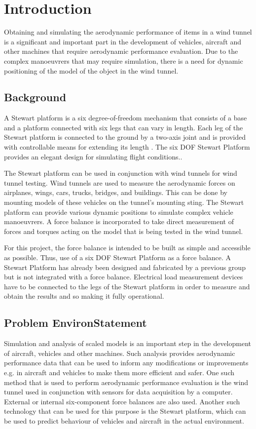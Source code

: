 \chapter{Introduction}
\label{sec:introduction}
Obtaining and simulating the aerodynamic performance of items in a wind tunnel is a
significant and important part in the development of vehicles, aircraft and other machines
that require aerodynamic performance evaluation. Due to the complex manoeuvrers that
may require simulation, there is a need for dynamic positioning of the model of the object
in the wind tunnel.
\section{Background}
A Stewart platform is a six degree-of-freedom mechanism that consists of a base and a platform connected with six legs that can vary in length. Each leg of the Stewart platform is connected to the ground by a two-axis joint and is provided with controllable means for extending its length
\cite{wittenburg2016stewart}. The six DOF Stewart Platform provides an elegant design for simulating flight conditions.\cite{stewart1965platform}. 

The Stewart platform can be used in conjunction with wind tunnels for wind tunnel testing. Wind tunnels are used to measure the aerodynamic forces on airplanes, wings, cars, trucks, bridges, and buildings. This can be done by mounting models of these vehicles on the tunnel's mounting sting. The Stewart platform can provide various dynamic positions to simulate complex vehicle manoeuvrers. A force balance is incorporated to take direct measurement of forces and torques acting on the model that is being tested in the wind tunnel.

For this project, the force balance is intended to be built as simple and accessible as possible. Thus, use of a six DOF Stewart Platform as a force balance. A Stewart Platform has already been designed and fabricated by a previous group but is not integrated with a force balance. Electrical load measurement devices have to be connected to the legs of the Stewart platform in order to measure and obtain the results and so making it fully operational.

\section{Problem EnvironStatement}
Simulation and analysis of scaled models is an important step in the development of aircraft, vehicles and other machines. Such analysis provides aerodynamic performance data that can be used to inform any modifications or improvements e.g. in aircraft and vehicles to make them more efficient and safer. One such method that is used to perform aerodynamic performance evaluation is the wind tunnel used in conjunction with sensors for data acquisition by a computer. External or internal six-component force balances are also used. Another such technology that can be used for this purpose is the Stewart platform, which can be used to predict behaviour of vehicles and aircraft in the actual environment.

